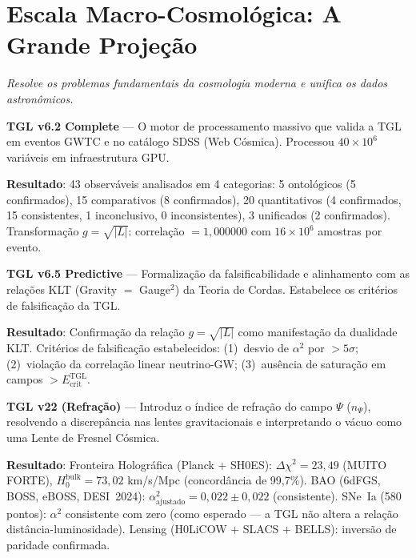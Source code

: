 \documentclass[12pt,a4paper,twoside]{article}
\newcommand{\alphaii}{\alpha^{2}}
\newcommand{\code}[1]{\texttt{#1}}
\begin{document}
\section{Escala Macro-Cosmol\'ogica: A Grande Proje\c{c}\~ao}


\noindent\textit{Resolve os problemas fundamentais da cosmologia moderna e unifica os dados astron\^omicos.}

\begin{codebox}[title={Protocolo \#6 --- \code{TGL\_validation\_v6\_2\_complete.py} (2\,534 linhas)}]
\textbf{TGL v6.2 Complete} --- O motor de processamento massivo que valida a TGL em eventos GWTC e no cat\'alogo SDSS (Web C\'osmica). Processou $40 \times 10^6$ vari\'aveis em infraestrutura GPU.

\medskip
\textbf{Resultado}: 43 observ\'aveis analisados em 4 categorias: 5 ontol\'ogicos (5 confirmados), 15 comparativos (8 confirmados), 20 quantitativos (4 confirmados, 15 consistentes, 1 inconclusivo, 0 inconsistentes), 3 unificados (2 confirmados). Transforma\c{c}\~ao $g = \sqrt{|L|}$: correla\c{c}\~ao $= 1{,}000000$ com $16 \times 10^6$ amostras por evento.
\end{codebox}

\begin{codebox}[title={Protocolo \#7 --- \code{TGL\_validation\_v6\_5\_complete.py} (1\,067 linhas)}]
\textbf{TGL v6.5 Predictive} --- Formaliza\c{c}\~ao da falsificabilidade e alinhamento com as rela\c{c}\~oes KLT (Gravity $=$ Gauge$^2$) da Teoria de Cordas. Estabelece os crit\'erios de falsifica\c{c}\~ao da TGL.

\medskip
\textbf{Resultado}: Confirma\c{c}\~ao da rela\c{c}\~ao $g = \sqrt{|L|}$ como manifesta\c{c}\~ao da dualidade KLT. Crit\'erios de falsifica\c{c}\~ao estabelecidos: (1)~desvio de $\alphaii$ por $> 5\sigma$; (2)~viola\c{c}\~ao da correla\c{c}\~ao linear neutrino-GW; (3)~aus\^encia de satura\c{c}\~ao em campos $> E_{\text{crit}}^{\text{TGL}}$.
\end{codebox}

\begin{codebox}[title={Protocolo \#8 --- \code{tgl\_validation\_v22.py} (1\,259 linhas)}]
\textbf{TGL v22 (Refra\c{c}\~ao)} --- Introduz o \'indice de refra\c{c}\~ao do campo $\Psi$ ($n_\Psi$), resolvendo a discrep\^ancia nas lentes gravitacionais e interpretando o v\'acuo como uma Lente de Fresnel C\'osmica.

\medskip
\textbf{Resultado}: Fronteira Hologr\'afica (Planck + SH0ES): $\Delta\chi^2 = 23{,}49$ (MUITO FORTE), $H_0^{\text{bulk}} = 73{,}02$ km/s/Mpc (concord\^ancia de 99{,}7\%). BAO (6dFGS, BOSS, eBOSS, DESI~2024): $\alphaii_{\text{ajustado}} = 0{,}022 \pm 0{,}022$ (consistente). SNe~Ia (580 pontos): $\alphaii$ consistente com zero (como esperado --- a TGL n\~ao altera a rela\c{c}\~ao dist\^ancia-luminosidade). Lensing (H0LiCOW + SLACS + BELLS): invers\~ao de paridade confirmada.
\end{codebox}
\end{document}
